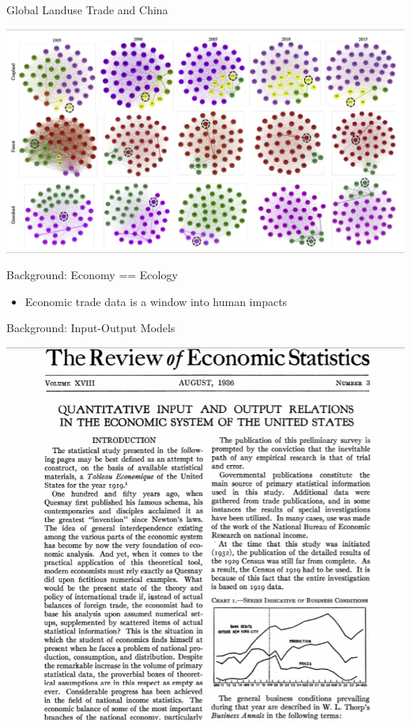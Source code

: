 \documentclass[ignorenonframetext,]{beamer}
\providecommand{\tightlist}{%
  \setlength{\itemsep}{0pt}\setlength{\parskip}{0pt}}
\begin{document}
\begin{frame}{Global Landuse Trade and China}
\protect\hypertarget{global-landuse-trade-and-china-1}{}

\begin{center}\includegraphics[width=0.5\linewidth]{images/Tian_2019_Fig3} \end{center}

\end{frame}

\begin{frame}{Background: Economy == Ecology}
\protect\hypertarget{background-economy-ecology}{}

\begin{itemize}
\tightlist
\item
  Economic trade data is a window into human impacts
\end{itemize}

\end{frame}

\begin{frame}{Background: Input-Output Models}
\protect\hypertarget{background-input-output-models}{}

\begin{center}\includegraphics[width=0.5\linewidth]{images/leontief_1936} \end{center}

\end{frame}
\end{document}
